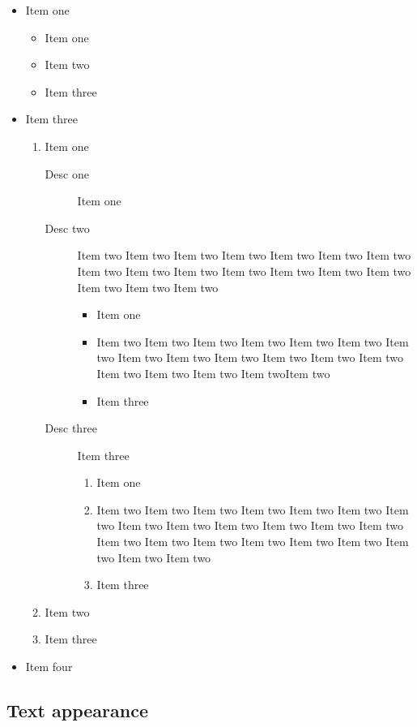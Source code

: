 \documentclass[numbered]{ivt-style/standard}\usepackage[]{graphicx}\usepackage[]{xcolor}
\begin{document}
\begin{itemize}
  \item Item one
  \begin{itemize}
    \item Item one
    \item Item two
    \item Item three
  \end{itemize}
  \item Item three
  \begin{enumerate}
    \item Item one
    \begin{description}
      \item[Desc one] Item one
      \item[Desc two] Item two Item two Item two Item two Item two
Item two Item two Item two Item two Item two Item two Item two Item
two Item two Item two Item two Item two
      \begin{itemize}
        \item Item one
        \item Item two Item two Item two Item two Item two Item
        two Item two Item two Item two Item two Item two Item two
        Item two Item
        two Item two Item two Item twoItem two
        \item Item three
      \end{itemize}
      \item[Desc three] Item three
      \begin{enumerate}
        \item Item one
        \item Item two Item two Item two Item two Item two Item two
        Item two Item two Item two Item two Item two Item two
        Item two Item
        two Item two Item two Item two Item two Item two Item two Item two Item
        two
        \item Item three
      \end{enumerate}
    \end{description}
    \item Item two
    \item Item three
  \end{enumerate}
  \item Item four
\end{itemize}

\subsection{Text appearance}
\end{document}

